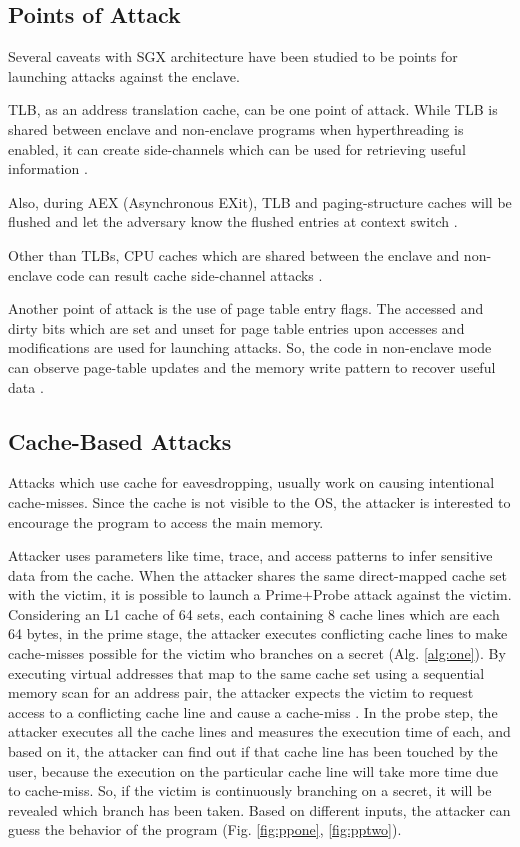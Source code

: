 \subsection{Points of Attack}
Several caveats with SGX architecture have been studied to be points for launching attacks against the enclave.

TLB, as an address translation cache, can be one point of attack. While TLB is shared between enclave and non-enclave programs when hyperthreading is enabled, it can create side-channels which can be used for retrieving useful information \cite{leakycauldron}.

Also, during AEX (Asynchronous EXit), TLB and paging-structure caches will be flushed and let the adversary know the flushed entries at context switch \cite{leakycauldron}.

Other than TLBs, CPU caches which are shared between the enclave and non-enclave code can result cache side-channel attacks \cite{leakycauldron}.

Another point of attack is the use of page table entry flags. The accessed and dirty bits which are set and unset for page table entries upon accesses and modifications are used for launching attacks. So, the code in non-enclave mode can observe page-table updates and the memory write pattern to recover useful data \cite{leakycauldron,stealthy}.

\subsection{Cache-Based Attacks}
Attacks which use cache for eavesdropping, usually work on causing intentional cache-misses. Since the cache is not visible to the OS, the attacker is interested to encourage the program to access the main memory.

Attacker uses parameters like time, trace, and access patterns to infer sensitive data from the cache. When the attacker shares the same direct-mapped cache set with the victim, it is possible to launch a Prime+Probe attack against the victim. Considering an L1 cache of 64 sets, each containing 8 cache lines which are each 64 bytes, in the prime stage, the attacker executes conflicting cache lines to make cache-misses possible for the victim who branches on a secret (Alg. \ref{alg:one}). By executing virtual addresses that map to the same cache set using a sequential memory scan for an address pair, the attacker expects the victim to request access to a conflicting cache line and cause a cache-miss \cite{mge}. In the probe step, the attacker executes all the cache lines and measures the execution time of each, and based on it, the attacker can find out if that cache line has been touched by the user, because the execution on the particular cache line will take more time due to cache-miss. So, if the victim is continuously branching on a secret, it will be revealed which branch has been taken. Based on different inputs, the attacker can guess the behavior of the program \cite{primeprobe1,primeprobe2,cloak} (Fig. \ref{fig:ppone}, \ref{fig:pptwo}).

